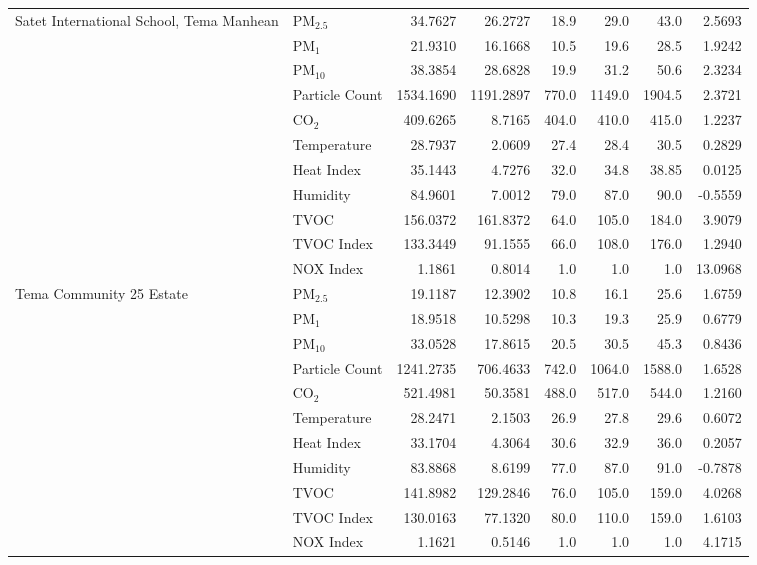 \documentclass[a4paper,fleqn]{cas-sc}
\begin{document}
\begin{table}[htb]
{\begin{tabular}{llrrrrrr}
\multirow{11}{*}{Satet International School, Tema Manhean}
& PM$_{2.5}$ & 34.7627 & 26.2727 & 18.9 & 29.0 & 43.0 & 2.5693 \\
& PM$_1$ & 21.9310 & 16.1668 & 10.5 & 19.6 & 28.5 & 1.9242 \\
& PM$_{10}$ & 38.3854 & 28.6828 & 19.9 & 31.2 & 50.6 & 2.3234 \\
& Particle Count & 1534.1690 & 1191.2897 & 770.0 & 1149.0 & 1904.5 & 2.3721 \\
& CO$_2$ & 409.6265 & 8.7165 & 404.0 & 410.0 & 415.0 & 1.2237 \\
& Temperature & 28.7937 & 2.0609 & 27.4 & 28.4 & 30.5 & 0.2829 \\
& Heat Index & 35.1443 & 4.7276 & 32.0 & 34.8 & 38.85 & 0.0125 \\
& Humidity & 84.9601 & 7.0012 & 79.0 & 87.0 & 90.0 & -0.5559 \\
& TVOC & 156.0372 & 161.8372 & 64.0 & 105.0 & 184.0 & 3.9079 \\
& TVOC Index & 133.3449 & 91.1555 & 66.0 & 108.0 & 176.0 & 1.2940 \\
& NOX Index & 1.1861 & 0.8014 & 1.0 & 1.0 & 1.0 & 13.0968 \\
\midrule

\multirow{11}{*}{Tema Community 25 Estate}
& PM$_{2.5}$ & 19.1187 & 12.3902 & 10.8 & 16.1 & 25.6 & 1.6759 \\
& PM$_1$ & 18.9518 & 10.5298 & 10.3 & 19.3 & 25.9 & 0.6779 \\
& PM$_{10}$ & 33.0528 & 17.8615 & 20.5 & 30.5 & 45.3 & 0.8436 \\
& Particle Count & 1241.2735 & 706.4633 & 742.0 & 1064.0 & 1588.0 & 1.6528 \\
& CO$_2$ & 521.4981 & 50.3581 & 488.0 & 517.0 & 544.0 & 1.2160 \\
& Temperature & 28.2471 & 2.1503 & 26.9 & 27.8 & 29.6 & 0.6072 \\
& Heat Index & 33.1704 & 4.3064 & 30.6 & 32.9 & 36.0 & 0.2057 \\
& Humidity & 83.8868 & 8.6199 & 77.0 & 87.0 & 91.0 & -0.7878 \\
& TVOC & 141.8982 & 129.2846 & 76.0 & 105.0 & 159.0 & 4.0268 \\
& TVOC Index & 130.0163 & 77.1320 & 80.0 & 110.0 & 159.0 & 1.6103 \\
& NOX Index & 1.1621 & 0.5146 & 1.0 & 1.0 & 1.0 & 4.1715 \\
\midrule


\end{tabular}}
\end{table}
\end{document}
